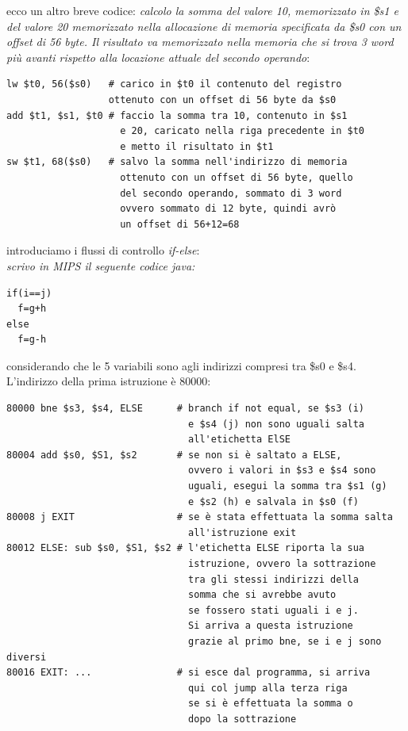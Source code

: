 \documentclass[a4paper,12pt, oneside]{book}
\begin{document}
\newpage
ecco un altro breve codice:
\textit{calcolo la somma del valore 10, memorizzato in \$s1 e del valore 20 memorizzato nella allocazione di memoria specificata da \$s0 con un offset di 56 byte. Il risultato va memorizzato nella memoria che si trova 3 word più avanti rispetto alla locazione attuale del secondo operando}:
\begin{verbatim}
lw $t0, 56($s0)   # carico in $t0 il contenuto del registro 
                  ottenuto con un offset di 56 byte da $s0
add $t1, $s1, $t0 # faccio la somma tra 10, contenuto in $s1
                    e 20, caricato nella riga precedente in $t0
                    e metto il risultato in $t1
sw $t1, 68($s0)   # salvo la somma nell'indirizzo di memoria
                    ottenuto con un offset di 56 byte, quello
                    del secondo operando, sommato di 3 word
                    ovvero sommato di 12 byte, quindi avrò
                    un offset di 56+12=68
\end{verbatim}
\newpage
introduciamo i flussi di controllo \textit{if-else}:\\
\textit{scrivo in MIPS il seguente codice java:}
\begin{verbatim}
if(i==j)
  f=g+h
else
  f=g-h
\end{verbatim}
considerando che le 5 variabili sono agli indirizzi compresi tra \$s0 e \$s4. L'indirizzo della prima istruzione è 80000:
\begin{verbatim}
80000 bne $s3, $s4, ELSE      # branch if not equal, se $s3 (i) 
                                e $s4 (j) non sono uguali salta
                                all'etichetta ElSE
80004 add $s0, $S1, $s2       # se non si è saltato a ELSE, 
                                ovvero i valori in $s3 e $s4 sono
                                uguali, esegui la somma tra $s1 (g)
                                e $s2 (h) e salvala in $s0 (f)
80008 j EXIT                  # se è stata effettuata la somma salta 
                                all'istruzione exit
80012 ELSE: sub $s0, $S1, $s2 # l'etichetta ELSE riporta la sua
                                istruzione, ovvero la sottrazione
                                tra gli stessi indirizzi della 
                                somma che si avrebbe avuto
                                se fossero stati uguali i e j.
                                Si arriva a questa istruzione 
                                grazie al primo bne, se i e j sono diversi
80016 EXIT: ...               # si esce dal programma, si arriva 
                                qui col jump alla terza riga
                                se si è effettuata la somma o
                                dopo la sottrazione
\end{verbatim}
\end{document}
